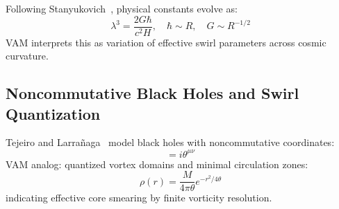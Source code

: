 \documentclass[11pt]{article}
\begin{document}
Following Stanyukovich~\cite{stanyukovich2008evolution}, physical constants evolve as:
\begin{equation}
    \lambda^3 = \frac{2G\hbar}{c^2 H}, \quad \hbar \sim R, \quad G \sim R^{-1/2}
\end{equation}
VAM interprets this as variation of effective swirl parameters across cosmic curvature.

\subsection{Noncommutative Black Holes and Swirl Quantization}

Tejeiro and Larrañaga~\cite{tejeiro2011noncomm} model black holes with noncommutative coordinates:
\begin{equation}
    [x^\mu, x^\nu] = i \theta^{\mu\nu}
\end{equation}
VAM analog: quantized vortex domains and minimal circulation zones:
\begin{equation}
    \rho(r) = \frac{M}{4\pi \theta} e^{-r^2/4\theta}
\end{equation}
indicating effective core smearing by finite vorticity resolution.



    \ifdefined\standalonechapter\else
    
    
\end{document}
